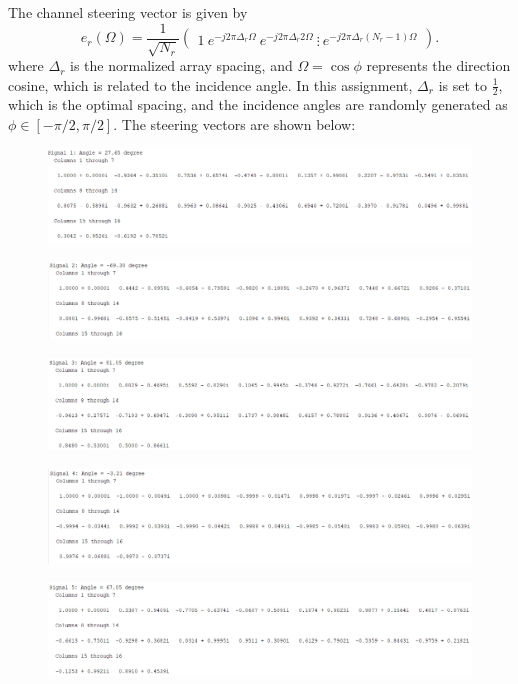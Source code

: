 The channel steering vector is given by
\begin{equation*}
    e_r\left(\Omega\right) = \frac{1}{\sqrt{N_r}} \begin{pmatrix}
    1 \
    e^{-j 2 \pi \Delta_r \Omega} \
    e^{-j 2 \pi \Delta_r 2\Omega} \
    \vdots \
    e^{-j 2 \pi \Delta_r (N_r - 1)\Omega}
    \end{pmatrix}.
\end{equation*}
where $\Delta_r$ is the normalized array spacing, and $\Omega = \cos \phi$ represents the direction cosine, which is related to the incidence angle. In this assignment, $\Delta_r$ is set to $\frac{1}{2}$, which is the optimal spacing, and the incidence angles are randomly generated as $\phi \in \left[-\pi/2, \pi/2\right]$. The steering vectors are shown below:

\begin{figure}[H]
    \centering
    \includegraphics[scale = 0.6]{s1.png}
\end{figure}
\begin{figure}[H]
    \centering
    \includegraphics[scale = 0.6]{s2.png}
\end{figure}
\begin{figure}[H]
    \centering
    \includegraphics[scale = 0.6]{s3.png}
\end{figure}
\begin{figure}[H]
    \centering
    \includegraphics[scale = 0.6]{s4.png}
\end{figure}
\begin{figure}[H]
    \centering
    \includegraphics[scale = 0.6]{s5.png}
\end{figure}